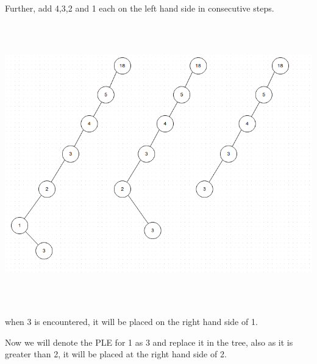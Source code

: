 \documentclass[letterpaper,portrait,12pt]{article}
\begin{document}
\begin{flushleft}
	
\end{flushleft}


\begin{flushleft}

\end{flushleft}


\begin{flushleft}
	Further, add 4,3,2 and 1 each on the left hand side in consecutive steps.\newpage

\end{flushleft}


\begin{flushleft}
\includegraphics[height=4.8097in,width=6.3514in]{3eca3e60-1aae-11e3-8e67-99a1a326a3b2.png}

\end{flushleft}


\begin{flushleft}
	when 3 is encountered, it will be placed on the right hand side of 1.
\end{flushleft}


\begin{flushleft}
	Now we will denote the PLE for 1 as 3 and replace it in the tree, also as it is greater than 2, it will be placed at the right hand side of 2.
\end{flushleft}
\end{document}

